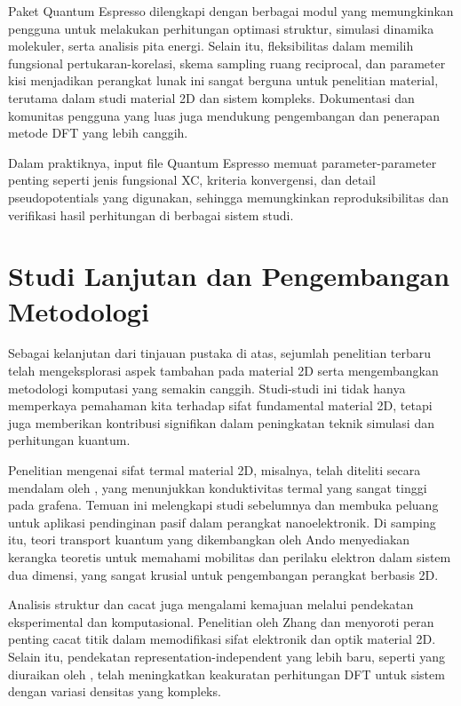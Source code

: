 Paket Quantum Espresso dilengkapi dengan berbagai modul yang memungkinkan pengguna untuk melakukan perhitungan optimasi struktur, simulasi dinamika molekuler, serta analisis pita energi. Selain itu, fleksibilitas dalam memilih fungsional pertukaran-korelasi, skema sampling ruang reciprocal, dan parameter kisi menjadikan perangkat lunak ini sangat berguna untuk penelitian material, terutama dalam studi material 2D dan sistem kompleks. Dokumentasi dan komunitas pengguna yang luas juga mendukung pengembangan dan penerapan metode DFT yang lebih canggih.

Dalam praktiknya, input file Quantum Espresso memuat parameter-parameter penting seperti jenis fungsional XC, kriteria konvergensi, dan detail pseudopotentials yang digunakan, sehingga memungkinkan reproduksibilitas dan verifikasi hasil perhitungan di berbagai sistem studi.

\section{Studi Lanjutan dan Pengembangan Metodologi}
Sebagai kelanjutan dari tinjauan pustaka di atas, sejumlah penelitian terbaru telah mengeksplorasi aspek tambahan pada material 2D serta mengembangkan metodologi komputasi yang semakin canggih. Studi-studi ini tidak hanya memperkaya pemahaman kita terhadap sifat fundamental material 2D, tetapi juga memberikan kontribusi signifikan dalam peningkatan teknik simulasi dan perhitungan kuantum.

Penelitian mengenai sifat termal material 2D, misalnya, telah diteliti secara mendalam oleh \citep{balandin_thermal_2011}, yang menunjukkan konduktivitas termal yang sangat tinggi pada grafena. Temuan ini melengkapi studi sebelumnya dan membuka peluang untuk aplikasi pendinginan pasif dalam perangkat nanoelektronik. Di samping itu, teori transport kuantum yang dikembangkan oleh Ando \citep{ando_dynamical_2002} menyediakan kerangka teoretis untuk memahami mobilitas dan perilaku elektron dalam sistem dua dimensi, yang sangat krusial untuk pengembangan perangkat berbasis 2D.

Analisis struktur dan cacat juga mengalami kemajuan melalui pendekatan eksperimental dan komputasional. Penelitian oleh Zhang \citep{zhang_point_2020} dan \citep{slotman_structure_2013} menyoroti peran penting cacat titik dalam memodifikasi sifat elektronik dan optik material 2D. Selain itu, pendekatan representation-independent yang lebih baru, seperti yang diuraikan oleh \citep{shen_representation-independent_2021}, telah meningkatkan keakuratan perhitungan DFT untuk sistem dengan variasi densitas yang kompleks.

